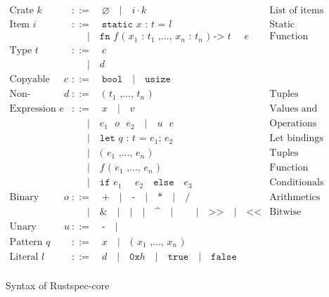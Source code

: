 \documentclass[10pt, english, a4paper]{article}
\newcommand{\rust}[1]{\texttt{#1}}
\begin{document}
\begin{figure}
\begin{align*}
\text{Crate } \rust{$k$}  &::=\quad \varnothing \quad|\quad i\cdot k &\text{List of items}\\
\text{Item } \rust{$i$}     &::=\quad \rust{static $x$ : $t$ = $l$}&\text{Static variables} \\
                            &\quad\;\;|\quad \rust{fn $f$ ( $x_1$ : $t_1$ ,..., $x_n$ : $t_n$ ) -> $t$ { $e$ }}&\text{Function}\\
\text{Type }\rust{$t$}      &::=\quad \rust{$c$}\\
                            &\quad\;\;|\quad \rust{$d$}\\
\text{Copyable type }\rust{$c$} &::=\quad \rust{bool}\quad|\quad \rust{usize} \\
\text{Non-copyable type }\rust{$d$} &::=\quad \rust{( $t_1$ ,..., $t_n$ )}&\text{Tuples} \\
\text{Expression }\rust{$e$}&::=\quad \rust{$x$}
                            \quad|\quad \rust{$v$}&\text{Values and variables} \\
                            &\quad\;\;|\quad \rust{$e_1$ $o$ $e_2$}
                            \quad|\quad \rust{$u$ $e$}&\text{Operations} \\
                            &\quad\;\;|\quad  \rust{let $q$ : $t$ = $e_1$; $e_2$}&\text{Let bindings} \\
                            &\quad\;\;|\quad \rust{( $e_1$ ,..., $e_n$ )}&\text{Tuples}\\
                            &\quad\;\;|\quad \rust{$f$ ( $e_1$ ,..., $e_n$ )}&\text{Function calls} \\
                            &\quad\;\;|\quad \rust{if $e_1$ { $e_2$ } else { $e_3$ } }&\text{Conditionals}\\
\text{Binary operator }\rust{$o$}&::=\quad \rust{+}
                            \quad|\quad \rust{-}
                            \quad|\quad \rust{*}
                            \quad|\quad \rust{/} &\text{Arithmetics}\\
                            &\quad\;\;|\quad \rust{&}
                            \quad|\quad\rust{|}
                            \quad|\quad \rust{^}
                            \quad|\quad \rust{~}
                            \quad|\quad \rust{>>}
                            \quad|\quad \rust{<<}&\text{Bitwise operations}
                            \\
\text{Unary operator }\rust{$u$}&::=\quad \rust{-}
                            \quad|\quad \rust{~}\\
\text{Pattern }\rust{$q$}&::=\quad \rust{$x$} \quad | \quad \rust{( $x_1$ ,..., $x_n$ )}\\
\text{Literal }\rust{$l$}&::=\quad \rust{$d$} \quad|\quad \rust{0x$h$}\quad|\quad\rust{true}\quad|\quad\rust{false}\\
\end{align*}
\caption{Syntax of Rustspec-core\label{fig:rustspec-core-syntax}}
\end{figure}
\end{document}
